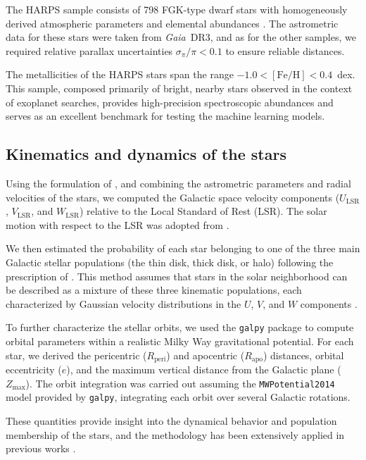 \documentclass{aa}
\begin{document}
\begin{appendix}
The HARPS sample consists of 798 FGK-type dwarf stars with homogeneously derived atmospheric parameters and elemental abundances \citep{Adibekyan-12, DelgadoMena-21}. The astrometric data for these stars were taken from \textit{Gaia}~DR3, and as for the other samples, we required relative parallax uncertainties $\sigma_\pi / \pi < 0.1$ to ensure reliable distances. 

The metallicities of the HARPS stars span the range $-1.0 < [\mathrm{Fe/H}] < 0.4$~dex. This sample, composed primarily of bright, nearby stars observed in the context of exoplanet searches, provides high-precision spectroscopic abundances and serves as an excellent benchmark for testing the machine learning models.


\subsection{Kinematics and dynamics of the stars}

Using the formulation of \citet{Johnson-87}, and combining the astrometric parameters and radial velocities of the stars, we computed the Galactic space velocity components ($U_{\mathrm{LSR}}$, $V_{\mathrm{LSR}}$, and $W_{\mathrm{LSR}}$) relative to the Local Standard of Rest (LSR). The solar motion with respect to the LSR was adopted from \citet{Schonrich-10}. 

We then estimated the probability of each star belonging to one of the three main Galactic stellar populations (the thin disk, thick disk, or halo) following the prescription of \citet{Reddy-06}. This method assumes that stars in the solar neighborhood can be described as a mixture of these three kinematic populations, each characterized by Gaussian velocity distributions in the $U$, $V$, and $W$ components \citep{Schwarzschild-1907}. 

To further characterize the stellar orbits, we used the \texttt{galpy} package \citep{Bovy-15} to compute orbital parameters within a realistic Milky Way gravitational potential. For each star, we derived the pericentric ($R_{\mathrm{peri}}$) and apocentric ($R_{\mathrm{apo}}$) distances, orbital eccentricity ($e$), and the maximum vertical distance from the Galactic plane ($Z_{\mathrm{max}}$). The orbit integration was carried out assuming the \texttt{MWPotential2014} model provided by \texttt{galpy}, integrating each orbit over several Galactic rotations. 

These quantities provide insight into the dynamical behavior and population membership of the stars, and the methodology has been extensively applied in previous works \citep[e.g.,][]{Adibekyan-12}.




\end{appendix}
\end{document}
